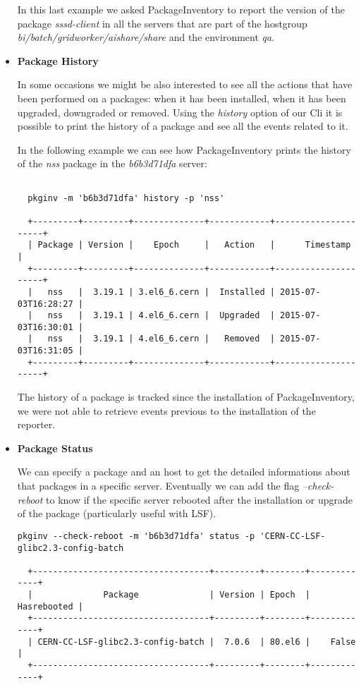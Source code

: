 \begin{itemize}
  In this last example we asked PackageInventory to report the version of
  the package \textit{sssd-client} in all the servers that are part of the
  hostgroup \textit{bi/batch/gridworker/aishare/share} and the environment
  \textit{qa}.
  
  \item \textbf{Package History}

  In some occasions we might be also interested to see all the actions
  that have been performed on a packages: when it has been installed, when
  it has been upgraded, downgraded or removed. Using the \textit{history}
  option of our Cli it is possible to print the history of a package and
  see all the events related to it.

  In the following example we can see how PackageInventory prints the
  history of the \textit{nss} package in the \textit{b6b3d71dfa} server:

  \begin{lstlisting}[frame=single,basicstyle=\tiny]

  pkginv -m 'b6b3d71dfa' history -p 'nss'

  +---------+---------+--------------+------------+---------------------+
  | Package | Version |    Epoch     |   Action   |      Timestamp      |
  +---------+---------+--------------+------------+---------------------+
  |   nss   |  3.19.1 | 3.el6_6.cern |  Installed | 2015-07-03T16:28:27 |
  |   nss   |  3.19.1 | 4.el6_6.cern |  Upgraded  | 2015-07-03T16:30:01 |
  |   nss   |  3.19.1 | 4.el6_6.cern |   Removed  | 2015-07-03T16:31:05 |
  +---------+---------+--------------+------------+---------------------+
  \end{lstlisting}

  The history of a package is tracked since the installation of
  PackageInventory, we were not able to retrieve events previous to the
  installation of the reporter.
 
  \item \textbf{Package Status}

  We can specify a package and an host to get the detailed informations
  about that packages in a specific server. Eventually we can add the flag
  \textit{--check-reboot} to know if the specific server rebooted after
  the installation or upgrade of the package (particularly useful with
  LSF).
 
  \begin{lstlisting}[frame=single,basicstyle=\tiny]
  pkginv --check-reboot -m 'b6b3d71dfa' status -p 'CERN-CC-LSF-glibc2.3-config-batch

  +-----------------------------------+---------+--------+-------------+
  |              Package              | Version | Epoch  | Hasrebooted |
  +-----------------------------------+---------+--------+-------------+
  | CERN-CC-LSF-glibc2.3-config-batch |  7.0.6  | 80.el6 |    False    |
  +-----------------------------------+---------+--------+-------------+
  \end{lstlisting} 

\end{itemize}

